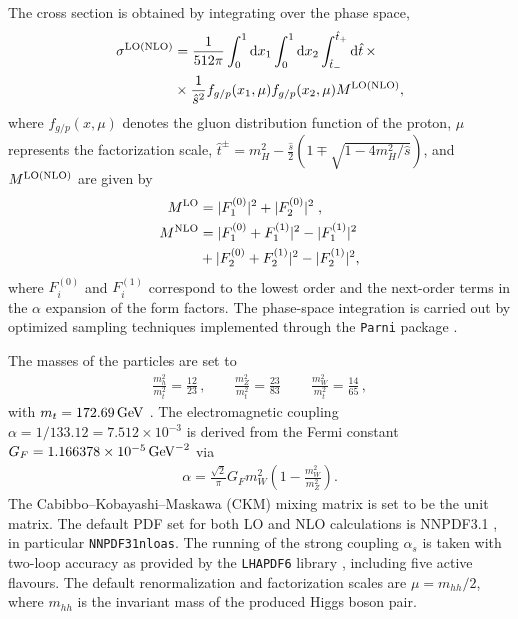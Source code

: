 The cross section is obtained by integrating over the phase space,
\begin{align}\label{eq:Xsection}
\sigma^{\rm LO(NLO)} &= \frac{1}{512\pi}\int_0^1 \mathrm{d}x_{1}\int_0^1 \mathrm{d}x_{2} \int^{\hat{t}_{+}}_{\hat{t}_{-}}\mathrm{d}\hat{t} \,\times \nonumber \\
& \times \frac{1}{\hat{s}^{2}}f_{g/p}(x_{1},\mu)f_{g/p}(x_{2},\mu) M^{\rm LO(NLO)},
\end{align}
where $f_{g/p}(x,\mu)$ denotes the gluon distribution function of the proton, $\mu$ represents the factorization scale, $\hat{t}^{\pm}=m^{2}_{H}-\frac{\hat{s}}{2}(1\mp\sqrt{1-{4m^{2}_{H}}/{\hat{s}}})$, and $M^{\rm LO(NLO)}$ are given by
\begin{align}
M^{\rm LO}&=|F_{1}^{(0)}|^2+|F_{2}^{(0)}|^2 \;,\\
M^{\rm NLO}&=|F_{1}^{(0)}+F_{1}^{(1)}|^2-|F_{1}^{(1)}|^2\nonumber\\
&+|F_{2}^{(0)}+F_{2}^{(1)}|^2  -|F_{2}^{(1)}|^2,
\end{align}
where $F_i^{(0)}$ and $F_i^{(1)}$ correspond to the lowest order and the next-order terms in the $\alpha$ expansion of the form factors. The phase-space integration is carried out by optimized sampling techniques implemented through the {\tt Parni} package \cite{vanHameren:2007pt}.

The masses of the particles are set to
\begin{eqnarray}
\frac{m_h^2}{m_t^2}=\frac{12}{23}
\,,\qquad
\frac{m_Z^2}{m_t^2}=\frac{23}{83}
\,\qquad
\frac{m_W^2}{m_t^2}=\frac{14}{65}
\,,
\end{eqnarray}
with $m_t=172.69\,\textup{GeV}$ \cite{ParticleDataGroup:2022pth}. The electromagnetic coupling $\alpha=1/133.12=7.512\times 10^{-3}$ is derived from the Fermi constant $G_F=1.166378\times 10^{-5}\,\textup{GeV}^{-2}$ via
\begin{eqnarray}
\alpha=\frac{\sqrt{2}}{\pi}G_F m_W^2 \left(1-\frac{m_W^2}{m_Z^2}\right)
.
 \end{eqnarray}
The Cabibbo--Kobayashi--Maskawa (CKM) mixing matrix is set to be the unit matrix. The default PDF set for both LO and NLO calculations is NNPDF3.1 \cite{NNPDF:2017mvq}, in particular \texttt{NNPDF31\ttus nlo\ttus as}. The running of the strong coupling $\alpha_s$ is taken with two-loop accuracy as provided by the {\tt LHAPDF6} library \cite{Buckley:2014ana}, including five active flavours. The default renormalization and factorization scales are $\mu=m_{hh}/2$, where $m_{hh}$ is the invariant mass of the produced Higgs boson pair.

